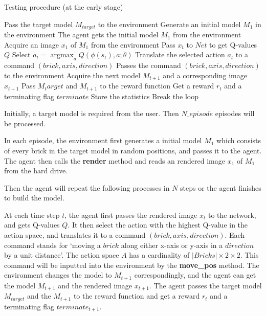 \documentclass[a4paper]{article}
\DeclareMathOperator{\argmax}{argmax}
\begin{document}
		        \begin{algorithm}[]
		        	\caption{Testing procedure (at the early stage)} \label{alg:test1}
		        	\begin{algorithmic}
		        		\State Pass the target model $M_{target}$ to the environment
		        		\State Generate an initial model $M_1$ in the environment
		        		\State The agent gets the initial model $M_1$ from the environment
		        		\State Acquire an image $x_1$ of $M_1$ from the environment
		        		\State Pass $x_t$ to $Net$ to get Q-values $Q$
		        		\State Select $a_t = \argmax_a Q(\phi(s_t), a;\theta)$
		        		\State Translate the selected action $a_t$ to a command $(brick, axis, direction)$
		        		\State Passes the command $(brick, axis, direction)$ to the environment
		        		\State Acquire the next model $M_{t+1}$ and a corresponding image $x_{t+1}$
		        		\State Pass $M_target$ and $M_{t+1}$ to the reward function
		        		\State Get a reward $r_t$ and a terminating flag $terminate$
		        		\State Store the statistics
		        		\State Break the loop 
		        		\EndIf
		        		
		        		\EndFor
		        		\EndProcedure
		        	\end{algorithmic}
		        \end{algorithm}
		        
		        Initially, a target model is required from the user. Then $N\_episode$ episodes will be processed. 
		        
		        In each episode, the environment first generates a initial model $M_1$ which consists of every brick in the target model in random positions, and passes it to the agent. The agent then calls the \textbf{render} method and reads an rendered image $x_1$ of $M_1$ from the hard drive. 
		        
		        \vspace{5mm}
		        
		        Then the agent will repeat the following processes in $N$ steps or the agent finishes to build the model. 
		        
		        At each time step $t$, the agent first passes the rendered image $x_t$ to the network, and gets Q-values $Q$. It then select the action with the highest Q-value in the action space, and translates it to a command $(brick, axis, direction)$. Each command stands for `moving a $brick$ along either x-axis or y-axis in a $direction$ by a unit distance'. The action space $A$ has a cardinality of $|Bricks| \times 2 \times 2$. This command will be inputted into the environment by the \textbf{move\_pos} method. The environment changes the model to $M_{t+1}$ correspondingly, and the agent can get the model $M_{t+1}$ and the rendered image $x_{t+1}$. The agent passes the target model $M_{target}$ and the $M_{t+1}$ to the reward function and get a reward $r_t$ and a terminating flag $terminate_{t+1}$. 
		        
\end{document}
